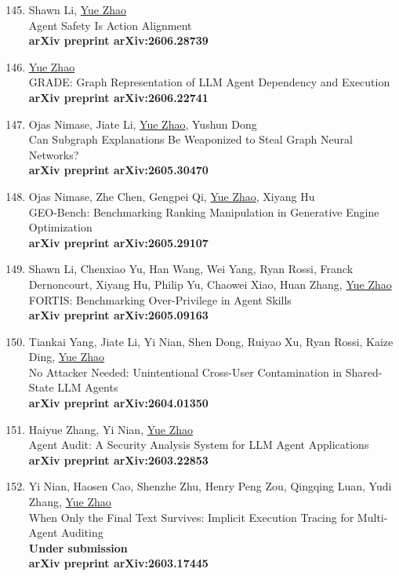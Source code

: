 \documentclass[margin,line,pifont,palatino,courier]{res}
\newenvironment{benumerate}[1]{
    \let\oldItem\item
    \def\item{\addtocounter{enumi}{-2}\oldItem}
    \begin{enumerate}[leftmargin=0.25in,label=\textcolor{uscred}{\arabic*.}]
    \setcounter{enumi}{#1}
    \addtocounter{enumi}{1}
}{
    \end{enumerate}
}
\begin{document}
\begin{resume}
\begin{benumerate}{144}
    \item
    Shawn Li, \underline{Yue Zhao}\\
    Agent Safety Is Action Alignment\\
    \textbf{arXiv preprint arXiv:2606.28739}

    \item
    \underline{Yue Zhao}\\
    GRADE: Graph Representation of LLM Agent Dependency and Execution\\
    \textbf{arXiv preprint arXiv:2606.22741}

    \item
    Ojas Nimase, Jiate Li, \underline{Yue Zhao}, Yushun Dong\\
    Can Subgraph Explanations Be Weaponized to Steal Graph Neural Networks?\\
    \textbf{arXiv preprint arXiv:2605.30470}

    \item
    Ojas Nimase, Zhe Chen, Gengpei Qi, \underline{Yue Zhao}, Xiyang Hu\\
    GEO-Bench: Benchmarking Ranking Manipulation in Generative Engine Optimization\\
    \textbf{arXiv preprint arXiv:2605.29107}

    \item
    Shawn Li, Chenxiao Yu, Han Wang, Wei Yang, Ryan Rossi, Franck Dernoncourt, Xiyang Hu, Philip Yu, Chaowei Xiao, Huan Zhang, \underline{Yue Zhao}\\
    FORTIS: Benchmarking Over-Privilege in Agent Skills\\
    \textbf{arXiv preprint arXiv:2605.09163}

    \item
    Tiankai Yang, Jiate Li, Yi Nian, Shen Dong, Ruiyao Xu, Ryan Rossi, Kaize Ding, \underline{Yue Zhao}\\
    No Attacker Needed: Unintentional Cross-User Contamination in Shared-State LLM Agents\\
    \textbf{arXiv preprint arXiv:2604.01350}

    \item
    Haiyue Zhang, Yi Nian, \underline{Yue Zhao}\\
    Agent Audit: A Security Analysis System for LLM Agent Applications\\
    \textbf{arXiv preprint arXiv:2603.22853}

    \item
    Yi Nian, Haosen Cao, Shenzhe Zhu, Henry Peng Zou, Qingqing Luan, Yudi Zhang, \underline{Yue Zhao}\\
    When Only the Final Text Survives: Implicit Execution Tracing for Multi-Agent Auditing\\
    \textbf{Under submission}\\
    \textbf{arXiv preprint arXiv:2603.17445}


\end{benumerate}
\end{resume}
\end{document}
